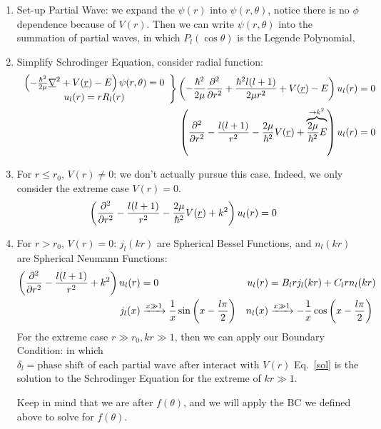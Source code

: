 \documentclass{school-22.101-notes}
\begin{document}
\begin{enumerate}
\item Set-up Partial Wave: we expand the $\psi(r)$ into $\psi(r, \theta)$, notice there is no $\phi$ dependence because of $V(r)$. Then we can write $\psi(r,\theta)$ into the summation of partial waves, in which $P_l (\cos \theta)$ is the Legende Polynomial, 

\item Simplify Schrodinger Equation, consider radial function: 
\begin{align}
\left. \begin{array}{c}
\left(- \frac{\hbar^2}{2 \mu} \underline{\nabla}^2 + V(\underline{r}) - E  \right) \psi(r,\theta) = 0 \\
u_l (r) = r R_l (r) 
\end{array} \right\} 
\left( -\frac{\hbar^2}{2 \mu} \frac{\partial^{2} }{\partial r ^{2}} +\frac{\hbar^2 l(l+1)}{2 \mu r^2} + V(\underline{r}) - E  \right) u_l (r) &= 0 \\
\left( \frac{\partial^{2} }{\partial r ^{2}} - \frac{l(l+1)}{r^2} - \frac{2\mu}{\hbar^2} V(\underline{r}) + \overbrace{\frac{2\mu}{\hbar^2} E}^{\to k^2}  \right) u_l (r) &= 0 
\end{align}

\item For $r\le r_0$, $V(r) \neq 0$: we don't actually pursue this case. Indeed, we only consider the extreme case $V (r) =0$. 
\begin{align}
\left( \frac{\partial^{2} }{\partial r ^{2}} - \frac{l(l+1)}{r^2} - \frac{2\mu}{\hbar^2} V(\underline{r}) + k^2  \right) u_l (r) &= 0 
\end{align}

\item For $r>r_0$, $V(r) =0$: $j_l (kr)$ are Spherical Bessel Functions, and $n_l (kr)$ are Spherical Neumann Functions:
\begin{align}
\left( \frac{\partial^{2} }{\partial r ^{2}} - \frac{l(l+1)}{r^2} + k^2  \right) u_l (r) &= 0  & u_l (r) &= B_l r j_l (kr) + C_l r n_l (kr)  \\
j_l (x) &\xrightarrow{x \gg 1} \frac{1}{x} \sin \left( x - \frac{l \pi}{2} \right) & n_l (x) &\xrightarrow{x \gg 1} - \frac{1}{x} \cos \left( x - \frac{l \pi}{2} \right) 
\end{align}
For the extreme case $r \gg r_0, kr \gg 1$, then we can apply our Boundary Condition: 
in which $ \delta_l = \mbox{phase shift of each partial wave after interact with $V(r)$} $
Eq.~\ref{sol} is the solution to the Schrodinger Equation for the extreme of $kr \gg 1$. 

Keep in mind that we are after $f(\theta)$, and we will apply the BC we defined above to solve for $f(\theta)$. 
\end{enumerate}
\end{document}

